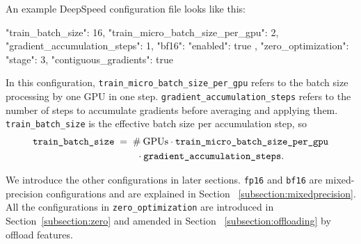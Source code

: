 An example DeepSpeed configuration file looks like this:

\begin{json}
{
    "train_batch_size": 16,
    "train_micro_batch_size_per_gpu": 2,
    "gradient_accumulation_steps": 1,
    "bf16": {
        "enabled": true
    },
    "zero_optimization": {
        "stage": 3,
        "contiguous_gradients": true
    }
}
\end{json}

In this configuration, \texttt{train\_micro\_batch\_size\_per\_gpu} refers to the 
batch size processing by one GPU in one step. \texttt{gradient\_accumulation\_steps} 
refers to the number of steps to accumulate gradients before averaging and applying 
them. \texttt{train\_batch\_size} is the effective batch size per accumulation step, 
so 
\begin{align*}
    \text{\texttt{train\_batch\_size}} \; &= \; 
    \# \: \text{GPUs} \cdot \text{\texttt{train\_micro\_batch\_size\_per\_gpu}} \\
    &\qquad \cdot \text{\texttt{gradient\_accumulation\_steps}} \text{.}
\end{align*}

We introduce the other configurations in later sections. \texttt{fp16} and 
\texttt{bf16} are mixed-precision configurations and are explained in Section~
\ref{subsection:mixedprecision}. All the configurations in \texttt{zero\_optimization} 
are introduced in Section~\ref{subsection:zero} and amended in Section~
\ref{subsection:offloading} by offload features.